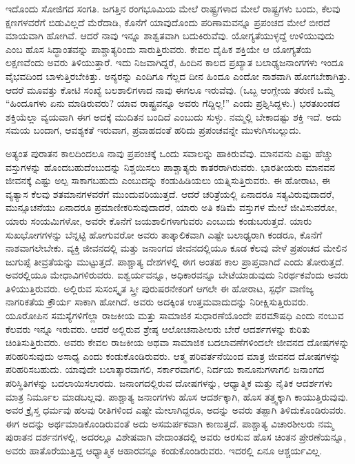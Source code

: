 ಇದೊಂದು ಸೋಜಿಗದ ಸಂಗತಿ. ಜಗತ್ತಿನ ರಂಗಭೂಮಿಯ ಮೇಲೆ ರಾಷ್ಟ್ರಗಳಾದ ಮೇಲೆ ರಾಷ್ಟ್ರಗಳು ಬಂದು, ಕೆಲವು ಕ್ಷಣಗಳವರೆಗೆ ಬಿಡುವಿಲ್ಲದೆ ಮೆರೆದಾಡಿ, ಕೊನೆಗೆ ಯಾವುದೊಂದು ಪರಿಣಾಮವನ್ನೂ ಪ್ರಪಂಚದ ಮೇಲೆ ಬೀರದೆ ಮಾಯವಾಗಿ ಹೋಗಿವೆ. ಆದರೆ ನಾವು ಇನ್ನೂ ಶಾಶ್ವತವಾಗಿ ಬದುಕಿರುವೆವು. ಯೋಗ್ಯತೆಯುಳ್ಳದ್ದೆ ಉಳಿಯುವುದು ಎಂಬ ಹೊಸ ಸಿದ್ಧಾಂತವನ್ನು ಪಾಶ್ಚಾತ್ಯರಿಂದು ಸಾರುತ್ತಿರುವರು. ಕೇವಲ ದೈಹಿಕ ಶಕ್ತಿಯೇ ಆ ಯೋಗ್ಯತೆಯ ಲಕ್ಷಣವೆಂದು ಅವರು ತಿಳಿಯುತ್ತಾರೆ. ಇದು ನಿಜವಾಗಿದ್ದರೆ, ಹಿಂದಿನ ಕಾಲದ ಪ್ರಖ್ಯಾತ ಬಲಾಢ್ಯ\break ಜನಾಂಗಗಳು ಇಂದೂ ವೈಭವದಿಂದ ಬಾಳುತ್ತಿರಬೇಕಿತ್ತು. ಅನ್ಯರನ್ನು ಎಂದಿಗೂ ಗೆಲ್ಲದ ದೀನ ಹಿಂದೂ ಎಂದೋ ನಾಶವಾಗಿ ಹೋಗಬೇಕಾಗಿತ್ತು. ಆದರೆ ಮೂವತ್ತು ಕೋಟಿ ಸಂಖ್ಯೆ ಬಲಶಾಲಿಗಳಾದ ನಾವು ಈಗಲೂ ಇರುವೆವು. (ಒಬ್ಬ ಆಂಗ್ಲೇಯ ತರುಣಿ ಒಮ್ಮೆ “ಹಿಂದೂಗಳು ಏನು ಮಾಡಿರುವರು? ಯಾವ ರಾಷ್ಟ್ರವನ್ನೂ ಅವರು ಗೆದ್ದಿಲ್ಲ!” ಎಂದು ಪ್ರಶ್ನಿಸಿದ್ದಳು.) ಭರತಖಂಡದ ಶಕ್ತಿಯೆಲ್ಲಾ ವ್ಯಯವಾಗಿ ಈಗ ಅದಕ್ಕೆ ಮುದಿತನ ಬಂದಿದೆ ಎಂಬುದು ಸುಳ್ಳು. ನಮ್ಮಲ್ಲಿ ಬೇಕಾದಷ್ಟು ಶಕ್ತಿ ಇದೆ. ಅದು ಸಮಯ ಬಂದಾಗ, ಆವಶ್ಯಕತೆ ಇರುವಾಗ, ಪ್ರವಾಹದಂತೆ ಹರಿದು ಪ್ರಪಂಚವನ್ನೇ ಮುಳುಗಿಸಬಲ್ಲುದು. 

ಅತ್ಯಂತ ಪುರಾತನ ಕಾಲದಿಂದಲೂ ನಾವು ಪ್ರಪಂಚಕ್ಕೆ ಒಂದು ಸವಾಲನ್ನು ಹಾಕಿರುವೆವು. ಮಾನವನು ಎಷ್ಟು ಹೆಚ್ಚು ವಸ್ತುಗಳನ್ನು ಹೊಂದಬಹುದೆಂಬುದನ್ನು ನಿಶ್ಚಯಿಸಲು ಪಾಶ್ಚಾತ್ಯರು ಕಾತರರಾಗಿರುವರು. ಭಾರತೀಯರು ಮಾನವನ ಜೀವನಕ್ಕೆ ಎಷ್ಟು ಅಲ್ಪ ಸಾಕಾಗಬಹುದು ಎಂಬುದನ್ನು ಕಂಡುಹಿಡಿಯಲು ಯತ್ನಿಸುತ್ತಿರುವರು. ಈ ಹೋರಾಟ, ಈ ವ್ಯತ್ಯಾಸ ಕೆಲವು ಶತಮಾನಗಳವರೆಗೆ ಮುಂದುವರಿಯುತ್ತದೆ. ಆದರೆ ಚರಿತ್ರೆಯಲ್ಲಿ ಏನಾದರೂ ಸತ್ಯವಿರುವುದಾದರೆ, ಮುನ್ಸೂಚನೆಯು ಏನಾದರೂ ಪ್ರಮಾಣೀಕರಿಸುವುದಾದರೆ, ಯಾರು ಅತಿ ಕಡಿಮೆ ವಸ್ತುಗಳ ಮೇಲೆ ಜೀವಿಸುವರೋ, ಯಾರು ಸಂಯಮಿಗಳೋ, ಅವರೇ ಕೊನೆಗೆ ಜಯಶಾಲಿಗಳಾಗುವರು ಎಂಬುದು ಕಂಡುಬರುತ್ತದೆ. ಯಾರು ಸುಖಭೋಗಗಳನ್ನು ಬೆನ್ನಟ್ಟಿ ಹೋಗುವರೋ ಅವರು ತಾತ್ಕಾಲಿಕವಾಗಿ ಎಷ್ಟೇ ಬಲಾಢ್ಯರಾಗಿ ಕಂಡರೂ, ಕೊನೆಗೆ ನಾಶವಾಗಲೇಬೇಕು. ವ್ಯಕ್ತಿ ಜೀವನದಲ್ಲಿ ಮತ್ತು ಜನಾಂಗದ ಜೀವನದಲ್ಲಿಯೂ ಕೂಡ ಕೆಲವು ವೇಳೆ ಪ್ರಪಂಚದ ಮೇಲಿನ ಜುಗುಪ್ಸೆ ತೀವ್ರತೆಯನ್ನು ಮುಟ್ಟುತ್ತದೆ. ಪಾಶ್ಚಾತ್ಯ ದೇಶಗಳಲ್ಲಿ ಈಗ ಅಂತಹ ಕಾಲ ಪ್ರಾಪ್ತವಾಗಿದೆ ಎಂದು ತೋರುತ್ತದೆ. ಅವರಲ್ಲಿಯೂ ಮೇಧಾವಿಗಳಿರುವರು. ಐಶ್ವರ್ಯವನ್ನೂ, ಅಧಿಕಾರವನ್ನೂ ಬೇಟೆಯಾಡುವುದು ನಿರರ್ಥಕವೆಂದು ಅವರು ತಿಳಿಯುತ್ತಿರುವರು. ಅಲ್ಲಿರುವ ಸುಸಂಸ್ಕೃತ ಸ್ತ್ರೀ ಪುರುಷರನೇಕರಿಗೆ ಆಗಲೇ ಈ ಹೋರಾಟ, ಸ್ಪರ್ಧೆ ವಾಣಿಜ್ಯ ನಾಗರಿಕತೆಯ ಕ್ರೌರ್ಯ ಸಾಕಾಗಿ ಹೋಗಿದೆ. ಅವರು ಅದಕ್ಕಿಂತ ಉತ್ತಮವಾದುದನ್ನು ನಿರೀಕ್ಷಿಸುತ್ತಿರುವರು. ಯೂರೋಪಿನ ಸಮಸ್ಯೆಗಳಿಗೆಲ್ಲಾ ರಾಜಕೀಯ ಮತ್ತು ಸಾಮಾಜಿಕ ಸುಧಾರಣೆಯೊಂದೇ ಪರಮೌಷಧಿ ಎಂದು ನಂಬುವ ಕೆಲವರು ಇನ್ನೂ ಇರುವರು. ಆದರೆ ಅಲ್ಲಿರುವ ಶ್ರೇಷ್ಠ ಆಲೋಚನಾಶೀಲರು ಬೇರೆ ಆದರ್ಶಗಳನ್ನು ಕುರಿತು ಚಿಂತಿಸುತ್ತಿರುವರು. ಅವರು ಕೇವಲ ರಾಜಕೀಯ ಅಥವಾ ಸಾಮಾಜಿಕ ಬದಲಾವಣೆಗಳಿಂದಲೇ ಜೀವನದ ದೋಷಗಳನ್ನು ಪರಿಹರಿಸುವುದು ಅಸಾಧ್ಯ ಎಂದು ಕಂಡುಕೊಂಡಿರುವರು. ಆತ್ಮ ಪರಿವರ್ತನೆಯಿಂದ ಮಾತ್ರ ಜೀವನದ ದೋಷಗಳನ್ನು ಪರಿಹರಿಸಬಹುದು. ಯಾವುದೇ ಬಲಾತ್ಕಾರವಾಗಲಿ, ಸರ್ಕಾರವಾಗಲಿ, ನಿರ್ದಯ ಕಾನೂನುಗಳಾಗಲಿ ಜನಾಂಗದ ಪರಿಸ್ಥಿತಿಗಳನ್ನು ಬದಲಾಯಿಸಲಾರದು. ಜನಾಂಗದಲ್ಲಿರುವ ದೋಷಗಳನ್ನು, ಆಧ್ಯಾತ್ಮಿಕ ಮತ್ತು ನೈತಿಕ ಆದರ್ಶಗಳು ಮಾತ್ರ ನಿರ್ಮೂಲ ಮಾಡಬಲ್ಲವು. ಪಾಶ್ಚಾತ್ಯ ಜನಾಂಗಗಳು ಹೊಸ ಆದರ್ಶಕ್ಕಾಗಿ, ಹೊಸ ತತ್ತ್ವಕ್ಕಾಗಿ ಕಾಯುತ್ತಿರುವುವು. ಅವರ ಕ್ರೈಸ್ತ ಧರ್ಮವು ಹಲವು ರೀತಿಗಳಿಂದ ಎಷ್ಟೇ ಮೇಲಾಗಿದ್ದರೂ, ಅದನ್ನು ಅವರು ತಪ್ಪಾಗಿ ತಿಳಿದುಕೊಂಡಿರುವರು. ಈಗ ಅದನ್ನು ಅರ್ಥಮಾಡಿಕೊಂಡಿರುವಂತೆ ಅದು ಅಸಮರ್ಪಕವಾಗಿ ಕಾಣುತ್ತದೆ. ಪಾಶ್ಚಾತ್ಯ ವಿಚಾರಶೀಲರು ನಮ್ಮ ಪುರಾತನ ದರ್ಶನಗಳಲ್ಲಿ, ಅದರಲ್ಲೂ ವಿಶೇಷವಾಗಿ ವೇದಾಂತದಲ್ಲಿ ಅವರು ಅರಸುವ ಹೊಸ ಚಿಂತನ ಪ್ರೇರಣೆಯನ್ನೂ, ಅವರು ಹಾತೊರೆಯುತ್ತಿದ್ದ ಆಧ್ಯಾತ್ಮಿಕ ಆಹಾರವನ್ನೂ ಕಂಡುಕೊಂಡಿರುವರು. ಇದರಲ್ಲಿ ಏನೂ ಆಶ್ಚರ್ಯವಿಲ್ಲ. 

